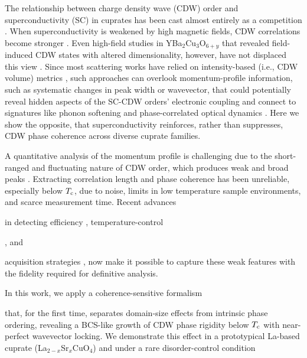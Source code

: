 \documentclass[floatfix,aps,twocolumn,preprintnumbers,superscriptaddress,floatfix,prl]{revtex4-2}
\begin{document}
The relationship between charge density wave (CDW) order and superconductivity (SC) in cuprates has been cast almost entirely as a competition \cite{Berg1,Fradkin1,Ghiringhelli1,Chang1,Blackburn1,Blanco-Canosa1,Wu1,LeBoeuf1,Silva1,Lee1,Agterberg1,Wu2,Keimer1,Achkar1,Wen1,Huang1,Lee2,Arpaia1,Tabis3,Blanco-Canosa2,Croft1,Kivelson1,Mesaros1,Hayward1,Nie1,Campi1,Jang1}. When superconductivity is weakened by high magnetic fields, CDW correlations become stronger \cite{Chang1,Wu1}. Even high-field studies in YBa$_2$Cu$_3$O$_{6+y}$ that revealed field-induced CDW states with altered dimensionality, however, have not displaced this view \cite{Wu2,Wu3,Gerber1,Chang2}. Since most scattering works have relied on intensity-based (i.e., CDW volume) metrics \cite{Ghiringhelli1,Chang1,Blackburn1,Blanco-Canosa1,Silva1,Achkar1,Wen1,Huang1,Lee2,Arpaia1,Tabis3,Blanco-Canosa2,Croft1,Hayward1}, such approaches can overlook momentum-profile information, such as systematic changes in peak width or wavevector, that could potentially reveal hidden aspects of the SC-CDW orders’ electronic coupling and connect to signatures like phonon softening \cite{Lee2,Arpaia1,Tacon1,Kim1,Reznik1,Pintschovius1,Devereaux1,Chaix1} and phase-correlated optical dynamics \cite{Sugai1,Torchinsky1,Nguyen1,Wandel1,Jang2}. Here we show the opposite, that superconductivity reinforces, rather than suppresses, CDW phase coherence across diverse cuprate families.




A quantitative analysis of the momentum profile is challenging due to the short-ranged and fluctuating nature of CDW order, which produces weak and broad peaks \cite{Kivelson1,Mesaros1,Hayward1,Nie1,Campi1,Jang1}. Extracting correlation length and phase coherence has been unreliable, especially below $T_{\rm c}$, due to noise, limits in low temperature sample environments, and scarce measurement time. Recent advances

in detecting efficiency \cite{Zhou1}, temperature-control

\cite{Kuo1}, and

acquisition strategies \cite{Wen1}, now make it possible to capture these weak features with the fidelity required for definitive analysis.

In this work, we apply a coherence-sensitive formalism

\cite{supp} that, for the first time, separates domain-size effects from intrinsic phase ordering, revealing a BCS-like growth of CDW phase rigidity below $T_{\rm c}$ with near-perfect wavevector locking. We demonstrate this effect in a prototypical La-based cuprate (La$_{2-x}$Sr$_x$CuO$_4$) and under a rare disorder-control condition
\end{document}
